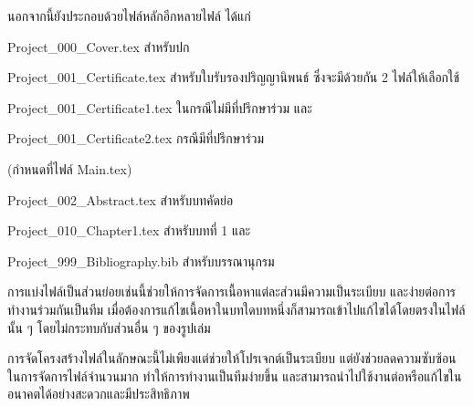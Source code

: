 \hspace*{1.5em}
นอกจากนี้ยังประกอบด้วยไฟล์หลักอีกหลายไฟล์ ได้แก่
\begin{mycustomitem}
    \item Project\_000\_Cover.tex สำหรับปก
    \item Project\_001\_Certificate.tex สำหรับใบรับรองปริญญานิพนธ์ ซึ่งจะมีด้วยกัน 2 ไฟล์ให้เลือกใช้ 
    \begin{mycustomitem}
        \item Project\_001\_Certificate1.tex ในกรณีไม่มีที่ปรึกษาร่วม และ 
        \item Project\_001\_Certificate2.tex กรณีมีที่ปรึกษาร่วม 
    \end{mycustomitem}
    (กำหนดที่ไฟล์ Main.tex)
    \item Project\_002\_Abstract.tex สำหรับบทคัดย่อ
    \item Project\_010\_Chapter1.tex สำหรับบทที่ 1 และ 
    \item Project\_999\_Bibliography.bib สำหรับบรรณานุกรม
\end{mycustomitem}
\hspace*{1.5em}
การแบ่งไฟล์เป็นส่วนย่อยเช่นนี้ช่วยให้การจัดการเนื้อหาแต่ละส่วนมีความเป็นระเบียบ และง่ายต่อการทำงานร่วมกันเป็นทีม เมื่อต้องการแก้ไขเนื้อหาในบทใดบทหนึ่งก็สามารถเข้าไปแก้ไขได้โดยตรงในไฟล์นั้น ๆ โดยไม่กระทบกับส่วนอื่น ๆ ของรูปเล่ม 

\begin{figure}[htbp]
\centering
{}
\caption{}
\label{fig4:StructureFile}
\end{figure}

\hspace*{1.5em}
การจัดโครงสร้างไฟล์ในลักษณะนี้ไม่เพียงแต่ช่วยให้โปรเจกต์เป็นระเบียบ แต่ยังช่วยลดความซับซ้อนในการจัดการไฟล์จำนวนมาก ทำให้การทำงานเป็นทีมง่ายขึ้น และสามารถนำไปใช้งานต่อหรือแก้ไขในอนาคตได้อย่างสะดวกและมีประสิทธิภาพ